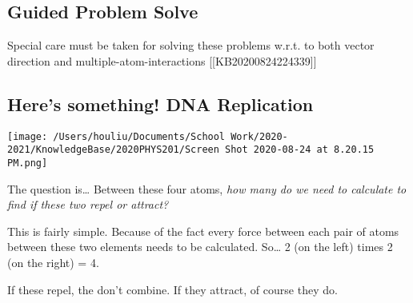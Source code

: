 \documentclass[
]{article}
\let\origfigure\figure
\let\endorigfigure\endfigure
\renewenvironment{figure}[1][2] {
    \expandafter\origfigure\expandafter[H]
} {
    \endorigfigure
}
\begin{document}
\hypertarget{guided-problem-solve}{%
\subsection{Guided Problem Solve}\label{guided-problem-solve}}

Special care must be taken for solving these problems w.r.t. to both
vector direction and multiple-atom-interactions
{[}{[}KB20200824224339{]}{]}

\hypertarget{heres-something-dna-replication}{%
\subsection{Here's something! DNA
Replication}\label{heres-something-dna-replication}}

\begin{figure}
\centering
\texttt{[image: /Users/houliu/Documents/School Work/2020-2021/KnowledgeBase/2020PHYS201/Screen Shot 2020-08-24 at 8.20.15 PM.png]}
\caption{Screen Shot 2020-08-24 at 8.20.15 PM.png}
\end{figure}

The question is\ldots{} Between these four atoms, \emph{how many do we
need to calculate to find if these two repel or attract?}

This is fairly simple. Because of the fact every force between each pair
of atoms between these two elements needs to be calculated. So\ldots{} 2
(on the left) times 2 (on the right) = 4.

If these repel, the don't combine. If they attract, of course they do.
\end{document}
